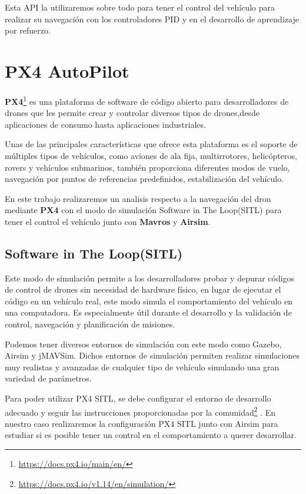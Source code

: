 Esta API la utilizaremos sobre todo para tener el control del vehículo para realizar su navegación con los controladores PID y en 
el desarrollo de aprendizaje por refuerzo. 

\section{PX4 AutoPilot}
\label{sec:px4}

\textbf{PX4}\footnote{\url{https://docs.px4.io/main/en/}} es una plataforma de software de código abierto para desarrolladores de drones que les permite crear 
y controlar diversos tipos de drones,desde aplicaciones de consumo hasta aplicaciones industriales. \newline

Unas de las principales características que ofrece esta plataforma es el soporte de múltiples tipos de vehículos, como aviones de 
ala fija, multirrotores, helicópteros, rovers y vehículos submarinos, también proporciona diferentes modos de vuelo, 
navegación por puntos de referencias predefinidos, estabilización del vehículo. \newline

En este trabajo realizaremos un analisis respecto a la navegación del dron mediante \textbf{PX4} con el modo de simulación Software in The Loop(SITL) para tener el control el vehículo junto con 
\textbf{Mavros} y \textbf{Airsim}.\newline
\subsection{Software in The Loop(SITL)}
\label{sec:px4 sitl} 
Este modo de simulación permite a los desarrolladores probar y depurar códigos de control de drones sin necesidad de hardware físico, en lugar de ejecutar el código en un 
vehículo real, este modo simula el comportamiento del vehículo en una computadora. Es especialmente útil durante el desarrollo y la validación de control, navegación y 
planificación de misiones. \newline

Podemos tener diversos entornos de simulación con este modo como Gazebo, Airsim y jMAVSim. Dichos entornos de simulación permiten realizar simulaciones muy realistas y avanzadas 
de cualquier tipo de vehículo simulando una gran variedad de parámetros.\newline

Para poder utilizar PX4 SITL, se debe configurar el entorno de desarrollo adecuado y seguir las instrucciones proporcionadas por la comunidad\footnote{\url{https://docs.px4.io/v1.14/en/simulation/}} .
En nuestro caso realizaremos la configuración PX4 SITL junto con Airsim para estudiar si es posible tener un control en el comportamiento a querer
desarrollar. 

